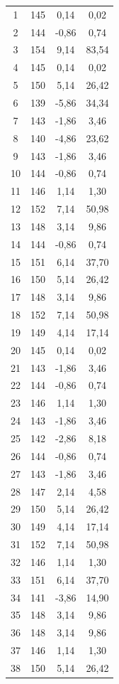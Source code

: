\documentclass[10pt]{article}
\begin{document}
\begin{xltabular}{\textwidth}{|c|c|c|c|}
1   & 145 & 0,14  & 0,02  \\
2   & 144 & -0,86 & 0,74  \\
3   & 154 & 9,14  & 83,54 \\
4   & 145 & 0,14  & 0,02  \\
5   & 150 & 5,14  & 26,42 \\
6   & 139 & -5,86 & 34,34 \\
7   & 143 & -1,86 & 3,46  \\
8   & 140 & -4,86 & 23,62 \\
9   & 143 & -1,86 & 3,46  \\
10  & 144 & -0,86 & 0,74  \\
11  & 146 & 1,14  & 1,30  \\
12  & 152 & 7,14  & 50,98 \\
13  & 148 & 3,14  & 9,86  \\
14  & 144 & -0,86 & 0,74  \\
15  & 151 & 6,14  & 37,70 \\
16  & 150 & 5,14  & 26,42 \\
17  & 148 & 3,14  & 9,86  \\
18  & 152 & 7,14  & 50,98 \\
19  & 149 & 4,14  & 17,14 \\
20  & 145 & 0,14  & 0,02  \\
21  & 143 & -1,86 & 3,46  \\
22  & 144 & -0,86 & 0,74  \\
23  & 146 & 1,14  & 1,30  \\
24  & 143 & -1,86 & 3,46  \\
25  & 142 & -2,86 & 8,18  \\
26  & 144 & -0,86 & 0,74  \\
27  & 143 & -1,86 & 3,46  \\
28  & 147 & 2,14  & 4,58  \\
29  & 150 & 5,14  & 26,42 \\
30  & 149 & 4,14  & 17,14 \\
31  & 152 & 7,14  & 50,98 \\
32  & 146 & 1,14  & 1,30  \\
33  & 151 & 6,14  & 37,70 \\
34  & 141 & -3,86 & 14,90 \\
35  & 148 & 3,14  & 9,86  \\
36  & 148 & 3,14  & 9,86  \\
37  & 146 & 1,14  & 1,30  \\
38  & 150 & 5,14  & 26,42 \\

\end{xltabular}
\end{document}
